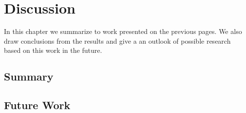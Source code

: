\chapter{Discussion} \label{chapter:conclusions}

In this chapter we summarize to work presented on the previous pages. We also draw conclusions from the results and give a an outlook of possible research based on this work in the future.

\section{Summary}

\section{Future Work}


